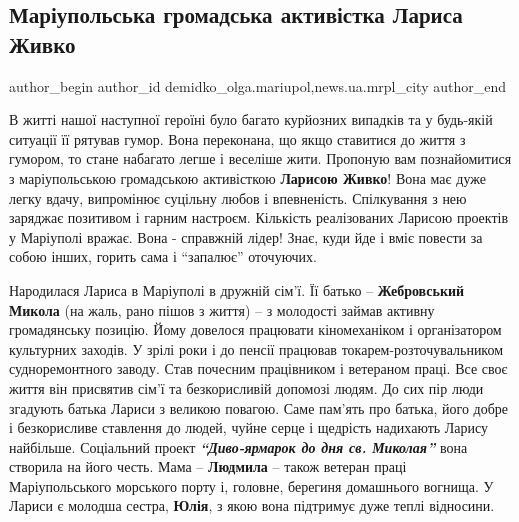  
 
 
 
 
 
\subsection{Маріупольська громадська активістка Лариса Живко}
\label{sec:19_05_2019.stz.news.ua.mrpl_city.1.gromad_activistka_larysa_zhyvko}
 
\ifcmt
 author_begin
   author_id demidko_olga.mariupol,news.ua.mrpl_city
 author_end
\fi


В житті нашої наступної героїні було багато курйозних випадків та у будь-якій
ситуації її рятував гумор. Вона переконана, що якщо ставитися до життя з
гумором, то стане набагато легше і веселіше жити. Пропоную вам познайомитися з
маріупольською громадською активісткою \textbf{Ларисою Живко}! Вона має дуже
легку вдачу, випромінює суцільну любов і впевненість. Спілкування з нею
заряджає позитивом і гарним настроєм. Кількість реалізованих Ларисою проектів у
Маріуполі вражає. Вона - справжній лідер! Знає, куди йде і вміє повести за
собою інших, горить сама і \enquote{запалює} оточуючих.

Народилася Лариса в Маріуполі в дружній сім'ї. Її батько – \textbf{Жебровський Микола}
(на жаль, рано пішов з життя) – з молодості займав активну громадянську
позицію. Йому довелося працювати кіномеханіком і організатором культурних
заходів. У зрілі роки і до пенсії працював токарем-розточувальником
судноремонтного заводу. Став почесним працівником і ветераном праці. Все своє
життя він присвятив сім'ї та безкорисливій допомозі людям. До сих пір люди
згадують батька Лариси з великою повагою. Саме пам'ять про батька, його добре і
безкорисливе ставлення до людей, чуйне серце і щедрість надихають Ларису
найбільше. Соціальний проект \textbf{\emph{\enquote{Диво-ярмарок до дня св. Миколая}}} вона
створила на його честь. Мама – \textbf{Людмила} – також ветеран праці Маріупольського
морського порту і, головне, берегиня домашнього вогнища. У Лариси є молодша
сестра, \textbf{Юлія}, з якою вона підтримує дуже теплі відносини.

